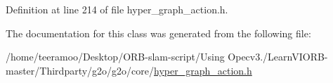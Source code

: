 Definition at line 214 of file hyper\+\_\+graph\+\_\+action.\+h.



The documentation for this class was generated from the following file\+:\begin{DoxyCompactItemize}
\item 
/home/teeramoo/\+Desktop/\+O\+R\+B-\/slam-\/script/\+Using Opecv3./\+Learn\+V\+I\+O\+R\+B-\/master/\+Thirdparty/g2o/g2o/core/\hyperlink{hyper__graph__action_8h}{hyper\+\_\+graph\+\_\+action.\+h}\end{DoxyCompactItemize}
